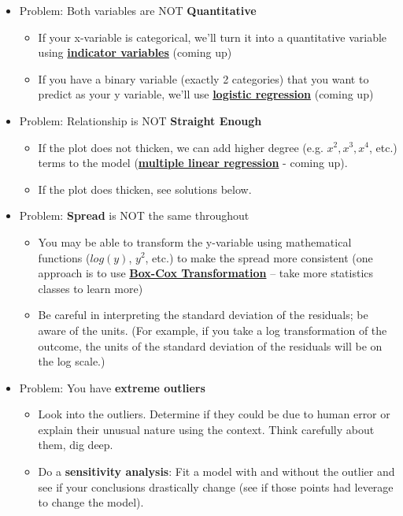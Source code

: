 \documentclass[]{book}
\providecommand{\tightlist}{%
  \setlength{\itemsep}{0pt}\setlength{\parskip}{0pt}}
\begin{document}
\begin{itemize}
\item
  Problem: Both variables are NOT \textbf{Quantitative}

  \begin{itemize}
  \tightlist
  \item
    If your x-variable is categorical, we'll turn it into a quantitative variable using \protect\hyperlink{indicator-variables}{\textbf{indicator variables}} (coming up)
  \item
    If you have a binary variable (exactly 2 categories) that you want to predict as your y variable, we'll use \protect\hyperlink{logistic-regression}{\textbf{logistic regression}} (coming up)
  \end{itemize}
\item
  Problem: Relationship is NOT \textbf{Straight Enough}

  \begin{itemize}
  \tightlist
  \item
    If the plot does not thicken, we can add higher degree (e.g. \(x^2, x^3, x^4\), etc.) terms to the model (\protect\hyperlink{multiple-linear-regression}{\textbf{multiple linear regression}} - coming up).
  \item
    If the plot does thicken, see solutions below.
  \end{itemize}
\item
  Problem: \textbf{Spread} is NOT the same throughout

  \begin{itemize}
  \tightlist
  \item
    You may be able to transform the y-variable using mathematical functions (\(log(y)\), \(y^2\), etc.) to make the spread more consistent (one approach is to use \href{https://en.wikipedia.org/wiki/Power_transform\#Box\%E2\%80\%93Cox_transformation}{\textbf{Box-Cox Transformation}} -- take more statistics classes to learn more)
  \item
    Be careful in interpreting the standard deviation of the residuals; be aware of the units. (For example, if you take a log transformation of the outcome, the units of the standard deviation of the residuals will be on the log scale.)
  \end{itemize}
\item
  Problem: You have \textbf{extreme outliers}

  \begin{itemize}
  \tightlist
  \item
    Look into the outliers. Determine if they could be due to human error or explain their unusual nature using the context. Think carefully about them, dig deep.
  \item
    Do a \textbf{sensitivity analysis}: Fit a model with and without the outlier and see if your conclusions drastically change (see if those points had leverage to change the model).
  \end{itemize}
\end{itemize}
\end{document}
